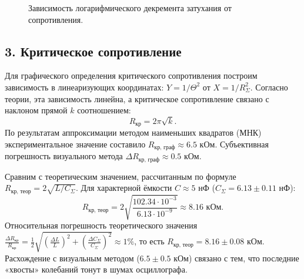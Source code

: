 \documentclass[a4paper,12pt]{extarticle}
\begin{document}
\begin{figure}[H]
    \centering
    \caption{Зависимость логарифмического декремента затухания от сопротивления.}
    \label{fig:Theta_vs_R}
\end{figure}

\subsection*{3. Критическое сопротивление}
Для графического определения критического сопротивления построим зависимость в линеаризующих координатах: $Y = 1/\Theta^2$ от $X = 1/R_\Sigma^2$. Согласно теории, эта зависимость линейна, а критическое сопротивление связано с наклоном прямой $k$ соотношением:
\begin{equation*}
    R_{\text{кр}} = 2\pi\sqrt{k}.
\end{equation*}
По результатам аппроксимации методом наименьших квадратов (МНК) экспериментальное значение составило $R_{\text{кр, граф}} \approx 6.5$ кОм. Субъективная погрешность визуального метода $\Delta R_{\text{кр, граф}} \approx 0.5$ кОм.

Сравним с теоретическим значением, рассчитанным по формуле $R_{\text{кр, теор}} = 2\sqrt{L/C_\Sigma}$. Для характерной ёмкости $C \approx 5$ нФ ($C_\Sigma = 6.13 \pm 0.11$ нФ):
\begin{equation*}
    R_{\text{кр, теор}} = 2\sqrt{\frac{102.34 \cdot 10^{-3}}{6.13 \cdot 10^{-9}}} \approx 8.16 \text{ кОм}.
\end{equation*}
Относительная погрешность теоретического значения $\frac{\Delta R_{\text{кр}}}{R_{\text{кр}}} = \frac{1}{2}\sqrt{(\frac{\Delta L}{L})^2 + (\frac{\Delta C_\Sigma}{C_\Sigma})^2} \approx 1\%$, то есть $R_{\text{кр, теор}} = 8.16 \pm 0.08$ кОм. Расхождение с визуальным методом ($6.5 \pm 0.5$ кОм) связано с тем, что последние «хвосты» колебаний тонут в шумах осциллографа.
\end{document}
